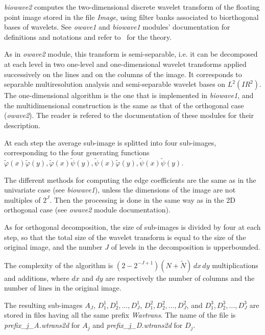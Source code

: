 \def\real{I\!\!R}

{\em biowave2} computes the two-dimensional discrete wavelet transform 
 of the floating point image stored in the file {\em Image}, 
using filter banks associated to biorthogonal bases of wavelets. 
See {\em owave1} and {\em biowave1} modules' documentation for definitions 
and notations and refer to~\cite{cohen.daubechies.ea:biorthogonal} for the theory.

As in {\em owave2} module, this transform is semi-separable, i.e. it can be 
decomposed at each level in two one-level and one-dimensional wavelet 
transforms applied successively on the lines and on the columns of the image. 
It corresponds to separable multiresolution analysis and semi-separable 
wavelet bases on \( L^{2}(\real^{2}) \).
The one-dimensional algorithm is the one that is implemented in 
{\em biowave1}, and the multidimensional construction is the same 
as that of the orthogonal case ({\em owave2}). The reader is refered 
to the documentation of these modules for their description.  

At each step the average sub-image is splitted into four sub-images, 
corresponding to the four generating functions 
$\tilde{\varphi}(x) \tilde{\varphi}(y), \tilde{\varphi}(x) \tilde{\psi}(y), 
\tilde{\psi}(x) \tilde{\varphi}(y), \tilde{\psi}(x) \tilde{\psi}(y)$. 

The different methods for computing the edge coefficients are the same as 
in the univariate case (see {\em biowave1}), unless the dimensions of the 
image are not multiples of $2^J$. Then the processing is done in the same 
way as in the 2D orthogonal case (see {\em owave2} module documentation). 

As for orthogonal decomposition, the size of sub-images is divided by four 
at each step, so that the total size of the wavelet transform is equal 
to the size of the original image, and the number $J$ of levels 
in the decomposition is upperbounded.

The complexity of the algorithm is $(2-2^{-J+1}) (N+\tilde{N}) \, dx\, dy$ 
multiplications and additions, where $dx$ and $dy$ are respectively 
the number of columns and the number of lines in the original image. 

The resulting sub-images  $A_{J}$, \( D^{1}_{1}, D^{1}_{2}, \ldots, D^{1}_{J} \), \( D^{2}_{1}, D^{2}_{2}, \ldots, D^{2}_{J} \), and \( D^{3}_{1}, D^{3}_{2}, \ldots, D^{3}_{J} \) are stored in files having all the same prefix {\em Wavtrans}. The name of the file is {\em prefix\_j\_A.wtrans2d} for \( A_{j} \) and {\em prefix\_j\_D.wtrans2d} for \( D_{j} \).

